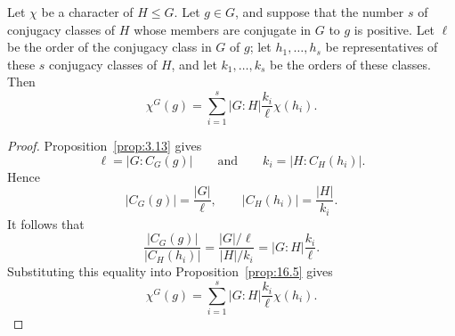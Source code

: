 \documentclass[../Odyssey_Project.tex]{subfiles}
\begin{document}
\begin{corollary}
\label{cor:16.6}
Let $\chi$ be a character of $H \leq G$. Let $g \in G$, and suppose that the number $s$ of conjugacy classes of $H$ whose members are conjugate in $G$ to $g$ is positive. Let $\ell$ be the order of the conjugacy class in $G$ of $g$; let $h_1, \dots, h_s$ be representatives of these $s$ conjugacy classes of $H$, and let $k_1, \dots, k_s$ be the orders of these classes. Then
\[
\chi^G(g) = \sum_{i=1}^s |G : H| \frac{k_i}{\ell} \chi(h_i).
\]
\end{corollary}

\begin{proof}
    Proposition~\ref{prop:3.13} gives
    \[
        \ell=|G : C_G(g)|
        \qquad\text{and}\qquad
        k_i=|H : C_H(h_i)|.
    \]
    Hence
    \[
        |C_G(g)|=\frac{|G|}{\ell},
        \qquad
        |C_H(h_i)|=\frac{|H|}{k_i}.
    \]
    It follows that
    \[
        \frac{|C_G(g)|}{|C_H(h_i)|}
        =
        \frac{|G|/\ell}{|H|/k_i}
        =
        |G : H|\frac{k_i}{\ell}.
    \]
    Substituting this equality into Proposition~\ref{prop:16.5} gives
    \[
        \chi^G(g)
        =
        \sum_{i=1}^{s}|G : H|\frac{k_i}{\ell}\chi(h_i).
    \]
\end{proof}
\end{document}
